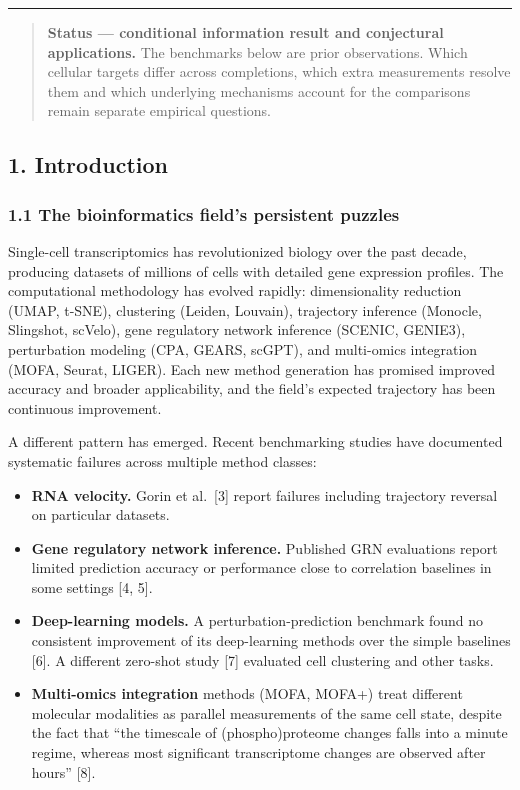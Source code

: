 \documentclass[
]{article}
\begin{document}
\begin{center}\rule{0.5\linewidth}{0.5pt}\end{center}

\begin{quote}
\textbf{Status --- conditional information result and conjectural
applications.} The benchmarks below are prior observations. Which
cellular targets differ across completions, which extra measurements
resolve them and which underlying mechanisms account for the comparisons
remain separate empirical questions.
\end{quote}

\hypertarget{introduction}{%
\subsection{1. Introduction}\label{introduction}}

\hypertarget{the-bioinformatics-fields-persistent-puzzles}{%
\subsubsection{1.1 The bioinformatics field's persistent
puzzles}\label{the-bioinformatics-fields-persistent-puzzles}}

Single-cell transcriptomics has revolutionized biology over the past
decade, producing datasets of millions of cells with detailed gene
expression profiles. The computational methodology has evolved rapidly:
dimensionality reduction (UMAP, t-SNE), clustering (Leiden, Louvain),
trajectory inference (Monocle, Slingshot, scVelo), gene regulatory
network inference (SCENIC, GENIE3), perturbation modeling (CPA, GEARS,
scGPT), and multi-omics integration (MOFA, Seurat, LIGER). Each new
method generation has promised improved accuracy and broader
applicability, and the field's expected trajectory has been continuous
improvement.

A different pattern has emerged. Recent benchmarking studies have
documented systematic failures across multiple method classes:

\begin{itemize}
\item
  \textbf{RNA velocity.} Gorin et al.~{[}3{]} report failures including
  trajectory reversal on particular datasets.
\item
  \textbf{Gene regulatory network inference.} Published GRN evaluations
  report limited prediction accuracy or performance close to correlation
  baselines in some settings {[}4, 5{]}.
\item
  \textbf{Deep-learning models.} A perturbation-prediction benchmark
  found no consistent improvement of its deep-learning methods over the
  simple baselines {[}6{]}. A different zero-shot study {[}7{]}
  evaluated cell clustering and other tasks.
\item
  \textbf{Multi-omics integration} methods (MOFA, MOFA+) treat different
  molecular modalities as parallel measurements of the same cell state,
  despite the fact that ``the timescale of (phospho)proteome changes
  falls into a minute regime, whereas most significant transcriptome
  changes are observed after hours'' {[}8{]}.
\end{itemize}
\end{document}
